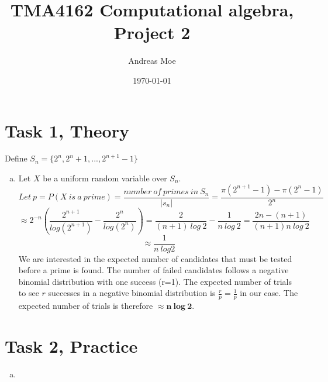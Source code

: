 \documentclass[12pt,a4paper]{article}
\title{TMA4162 Computational algebra, Project 2}
\author{Andreas Moe}
\date{\today}
\begin{document}
\maketitle

\section*{Task 1, Theory}
Define \(S_n = \{2^n, 2^n+1, ... , 2^{n+1}-1\}\)
\begin{enumerate}[a)]
    \item 
    Let \(X\) be a uniform random variable over \(S_n\).
    \[
    Let\ p = P(X\ is\ a\ prime) = \frac{number\ of\ primes\ in\ S_n}{|s_n|}
    = \frac{\pi(2^{n+1}-1) - \pi(2^n-1)}{2^n} \]
    \[\approx 
    2^{-n}\left(\frac{2^{n+1}}{log(2^{n+1})}-\frac{2^n}{log(2^n)}\right)
    = \frac{2}{(n+1)\ log\ 2}-\frac{1}{n\ log\ 2}
    = \frac{2n - (n+1)}{(n+1)n\ log\ 2}
    \]
    \[
    \approx \frac{1}{n\ log 2}
    \]
    We are interested in the expected number of candidates that must be tested before a prime is found. The number of failed candidates follows a negative binomial distribution with one success (r=1). The expected number of trials to see \(r\) successes in a negative binomial distribution is \(\frac{r}{p} = \frac{1}{p}\) in our case.
    The expected number of trials is therefore \(\approx \mathbf{n\ log\ 2}\).
\end{enumerate}

\section*{Task 2, Practice}

\begin{enumerate}[a)]
    \item 

\end{enumerate}
\end{document}
